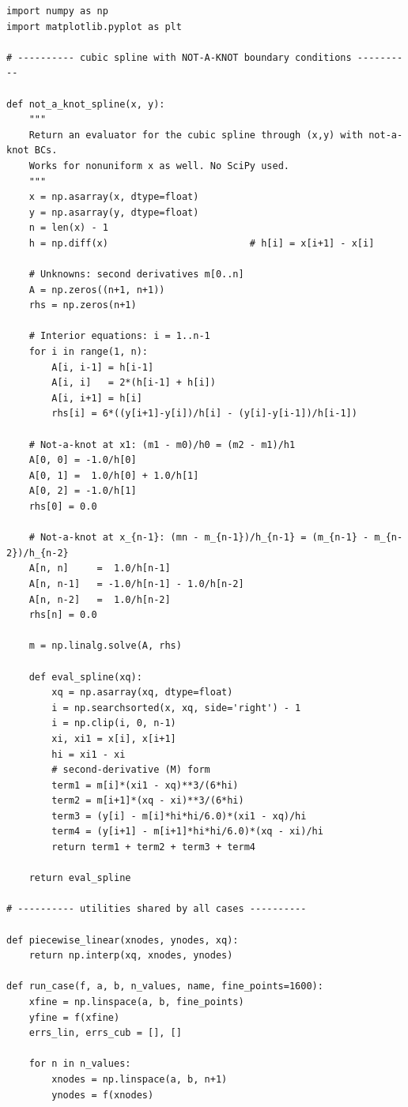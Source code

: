 \documentclass[11pt]{article}
\theoremstyle{definition}
\begin{document}
\begin{lstlisting}
import numpy as np
import matplotlib.pyplot as plt

# ---------- cubic spline with NOT-A-KNOT boundary conditions ----------

def not_a_knot_spline(x, y):
    """
    Return an evaluator for the cubic spline through (x,y) with not-a-knot BCs.
    Works for nonuniform x as well. No SciPy used.
    """
    x = np.asarray(x, dtype=float)
    y = np.asarray(y, dtype=float)
    n = len(x) - 1
    h = np.diff(x)                         # h[i] = x[i+1] - x[i]

    # Unknowns: second derivatives m[0..n]
    A = np.zeros((n+1, n+1))
    rhs = np.zeros(n+1)

    # Interior equations: i = 1..n-1
    for i in range(1, n):
        A[i, i-1] = h[i-1]
        A[i, i]   = 2*(h[i-1] + h[i])
        A[i, i+1] = h[i]
        rhs[i] = 6*((y[i+1]-y[i])/h[i] - (y[i]-y[i-1])/h[i-1])

    # Not-a-knot at x1: (m1 - m0)/h0 = (m2 - m1)/h1
    A[0, 0] = -1.0/h[0]
    A[0, 1] =  1.0/h[0] + 1.0/h[1]
    A[0, 2] = -1.0/h[1]
    rhs[0] = 0.0

    # Not-a-knot at x_{n-1}: (mn - m_{n-1})/h_{n-1} = (m_{n-1} - m_{n-2})/h_{n-2}
    A[n, n]     =  1.0/h[n-1]
    A[n, n-1]   = -1.0/h[n-1] - 1.0/h[n-2]
    A[n, n-2]   =  1.0/h[n-2]
    rhs[n] = 0.0

    m = np.linalg.solve(A, rhs)

    def eval_spline(xq):
        xq = np.asarray(xq, dtype=float)
        i = np.searchsorted(x, xq, side='right') - 1
        i = np.clip(i, 0, n-1)
        xi, xi1 = x[i], x[i+1]
        hi = xi1 - xi
        # second-derivative (M) form
        term1 = m[i]*(xi1 - xq)**3/(6*hi)
        term2 = m[i+1]*(xq - xi)**3/(6*hi)
        term3 = (y[i] - m[i]*hi*hi/6.0)*(xi1 - xq)/hi
        term4 = (y[i+1] - m[i+1]*hi*hi/6.0)*(xq - xi)/hi
        return term1 + term2 + term3 + term4

    return eval_spline

# ---------- utilities shared by all cases ----------

def piecewise_linear(xnodes, ynodes, xq):
    return np.interp(xq, xnodes, ynodes)

def run_case(f, a, b, n_values, name, fine_points=1600):
    xfine = np.linspace(a, b, fine_points)
    yfine = f(xfine)
    errs_lin, errs_cub = [], []

    for n in n_values:
        xnodes = np.linspace(a, b, n+1)
        ynodes = f(xnodes)


\end{lstlisting}
\end{document}
